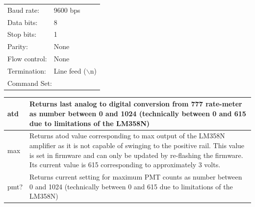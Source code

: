 \begin{table}[H]
	\centering
	
	\vspace{0.5em}
	
	\hspace*{-\parindent} %
	\begin{minipage}{\textwidth}
		\linespread{1.2}
		\selectfont
		
		\begin{tabular} {| l | l |} 
			
			\hline
			Baud rate: & 9600 bps \\
			Data bits: & 8 \\
			Stop bits: & 1 \\
			Parity: & None \\
			Flow control: & None \\
			Termination: & Line feed ($\backslash$n)\\
			\hline
			\multicolumn{2}{|l|}{Command Set:}\\
			\hline
			
		\end{tabular}
		
		\begin{tabular}{| l |p{} |}
			\hline
			atd & 
			\begin{minipage}{.8\textwidth} \vspace{1mm} Returns last analog to digital conversion from 777 rate-meter as number between 0 and 1024 (technically between 0 and 615 due to limitations of the LM358N)
			\end{minipage}	\\
			
			\hline
			
			max &
			\begin{minipage}{.8\textwidth} \vspace{1mm} Returns atod value corresponding to max output of the LM358N amplifier as it is not capable of swinging to the positive rail.  This value is set in firmware and can only be updated by re-flashing the firmware.  Its current value is 615 corresponding to approximately 3 volts.
			\end{minipage}\\
			
			\hline
			
			pmt? &
			\begin{minipage}{.8\textwidth} \vspace{1mm} Returns current setting for maximum PMT counts as number between 0 and 1024 (technically between 0 and 615 due to limitations of the LM358N)
			\end{minipage}\\
			

\end{tabular}
\end{minipage}
\end{table}
